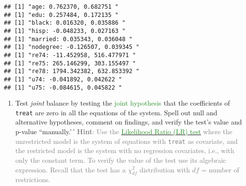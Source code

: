 \documentclass[
]{article}
\providecommand{\tightlist}{%
  \setlength{\itemsep}{0pt}\setlength{\parskip}{0pt}}
\begin{document}
\begin{verbatim}
## [1] "age: 0.762370, 0.682751 "
## [1] "edu: 0.257484, 0.172135 "
## [1] "black: 0.016320, 0.035886 "
## [1] "hisp: -0.048233, 0.027163 "
## [1] "married: 0.035343, 0.036048 "
## [1] "nodegree: -0.126507, 0.039345 "
## [1] "re74: -11.452958, 516.477971 "
## [1] "re75: 265.146299, 303.155497 "
## [1] "re78: 1794.342382, 632.853392 "
## [1] "u74: -0.041892, 0.042622 "
## [1] "u75: -0.084615, 0.045822 "
\end{verbatim}

\begin{enumerate}
\def\labelenumi{\alph{enumi}.}
\setcounter{enumi}{1}
\tightlist
\item
  Test \textit{joint} balance by testing the
  \textcolor{ForestGreen}{joint hypothesis} that the coefficients of
  \texttt{treat} are zero in all the equations of the system. Spell out
  null and alternative hypotheses, comment on findings, and verify the
  test's value and p-value ``manually.'\,'
  \textcolor{gray}{\textbf{Hint}: Use the \href{https://en.wikipedia.org/wiki/Likelihood-ratio_test}{\textcolor{ForestGreen}{Likelihood Ratio (LR) test}} where the unrestricted model is the system of equations with \texttt{treat} as covariate, and the restricted model is the system with no regression covariates, i.e., with only the constant term. To verify the value of the test use its algebraic expression. Recall that the test has a $\chi^{2}_{df}$ distribution with $df$ = number of restrictions.}
\end{enumerate}
\end{document}
